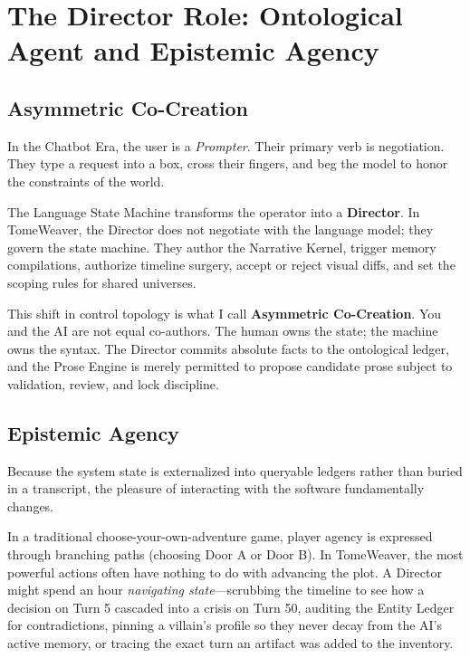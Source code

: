 \documentclass[12pt, a4paper]{article}
\begin{document}
\newpage
\section{The Director Role: Ontological Agent and Epistemic Agency}
\label{sec:agent}

\subsection{Asymmetric Co-Creation}

In the Chatbot Era, the user is a \textit{Prompter}. Their primary verb is negotiation. They type a request into a box, cross their fingers, and beg the model to honor the constraints of the world. 

The Language State Machine transforms the operator into a \textbf{Director}. In TomeWeaver, the Director does not negotiate with the language model; they govern the state machine. They author the Narrative Kernel, trigger memory compilations, authorize timeline surgery, accept or reject visual diffs, and set the scoping rules for shared universes.

This shift in control topology is what I call \textbf{Asymmetric Co-Creation}. You and the AI are not equal co-authors. The human owns the state; the machine owns the syntax. The Director commits absolute facts to the ontological ledger, and the Prose Engine is merely permitted to propose candidate prose subject to validation, review, and lock discipline. 

\subsection{Epistemic Agency}

Because the system state is externalized into queryable ledgers rather than buried in a transcript, the pleasure of interacting with the software fundamentally changes. 

In a traditional choose-your-own-adventure game, player agency is expressed through branching paths (choosing Door A or Door B). In TomeWeaver, the most powerful actions often have nothing to do with advancing the plot. A Director might spend an hour \textit{navigating state}---scrubbing the timeline to see how a decision on Turn 5 cascaded into a crisis on Turn 50, auditing the Entity Ledger for contradictions, pinning a villain's profile so they never decay from the AI's active memory, or tracing the exact turn an artifact was added to the inventory.
\end{document}
